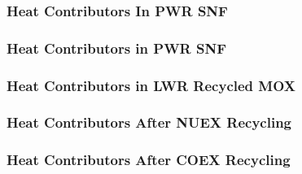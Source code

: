 
\begin{frame}[ctb!]
  \frametitle{Heat Contributors In PWR SNF}
\footnotesize{
  
}
\end{frame}

\begin{frame}[ctb!]
  \frametitle{Heat Contributors in PWR SNF}
\footnotesize{
  
}
\end{frame}
\begin{frame}[ctb!]
  \frametitle{Heat Contributors in LWR Recycled MOX}
\footnotesize{
  
}
\end{frame}
\begin{frame}[ctb!]
  \frametitle{Heat Contributors After NUEX Recycling}
\footnotesize{
  
}
\end{frame}

\begin{frame}[ctb!]
  \frametitle{Heat Contributors After COEX Recycling}
\footnotesize{
  
}
\end{frame}

